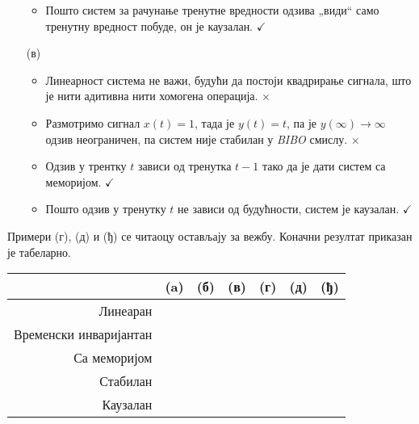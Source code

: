 \begin{enumerate}
\begin{itemize}
        \item Пошто систем за рачунање тренутне вредности одзива „види“ само тренутну вредност побуде, он је каузалан. \hfill $\checkmark$
    \end{itemize} 

    \item[(в)] 
    \begin{itemize}
        \item Линеарност система не важи, будући да постоји квадрирање сигнала, што је нити адитивна нити хомогена операција.
        \hfill $\times$

        \item Размотримо сигнал $x(t) = 1$, тада је $y(t) = t$, па је $y(\infty)\to\infty$ одзив неограничен, па 
        систем није стабилан у \textit{BIBO} смислу. \hfill $\times$

        \item Одзив у трентку $t$ зависи од тренутка  $t-1$ тако да је дати систем са меморијом. \hfill $\checkmark$
        
        \item Пошто одзив у тренутку $t$ не зависи од будућности, систем је каузалан. \hfill $\checkmark$
    \end{itemize}
\end{enumerate}

Примери (г), (д) и (ђ) се читаоцу остављају за вежбу. Коначни резултат приказан је табеларно. 

\begin{center}
\newcommand{\cm}{\checkmark}
\begin{tabular}{r|cccccc}
    & (a) & (б) & (в) & (г) & (д) & (ђ) \\
     \hline
    Линеаран               
    & \cm & \cm &    & \cm & \cm &    \\ 
    Временски инваријантан 
    & \cm    & \cm &    &     &  \cm   &    \\ 
    Са меморијом 
    & \cm &     &\cm & \cm &   \cm  & \\
    Стабилан 
    &     & \cm  & \cm & &  & \cm \\
    Каузалан 
    & \cm & \cm & \cm & \cm & & \cm \\
    \end{tabular}
\end{center}    
